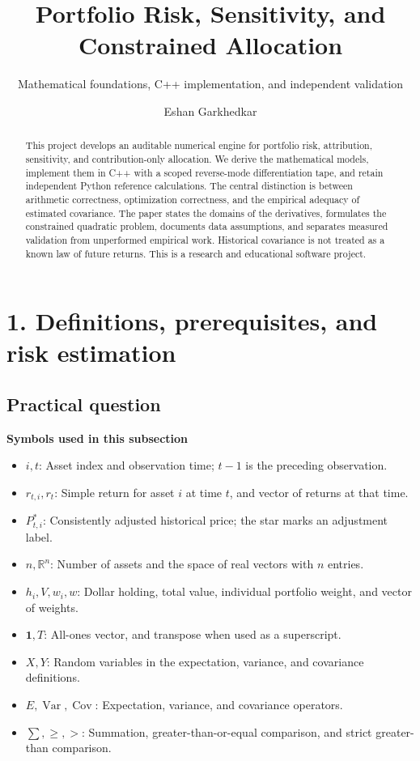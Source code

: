 \documentclass[
  american,
  11pt,
]{article}
\title{Portfolio Risk, Sensitivity, and Constrained Allocation}
\subtitle{Mathematical foundations, C++ implementation, and independent
validation}
\author{Eshan Garkhedkar}
\date{}
\begin{document}
\maketitle
\begin{abstract}
This project develops an auditable numerical engine for portfolio risk,
attribution, sensitivity, and contribution-only allocation. We derive
the mathematical models, implement them in C++ with a scoped
reverse-mode differentiation tape, and retain independent Python
reference calculations. The central distinction is between arithmetic
correctness, optimization correctness, and the empirical adequacy of
estimated covariance. The paper states the domains of the derivatives,
formulates the constrained quadratic problem, documents data
assumptions, and separates measured validation from unperformed
empirical work. Historical covariance is not treated as a known law of
future returns. This is a research and educational software project.
\end{abstract}

{
\setcounter{tocdepth}{2}
\tableofcontents
}
\section{1. Definitions, prerequisites, and risk
estimation}\label{definitions-prerequisites-and-risk-estimation}

\subsection{Practical question}\label{practical-question}

\textbf{Symbols used in this subsection}
\begin{itemize}
\item \(i,t\): Asset index and observation time; $t-1$ is the preceding observation.
\item \(r_{t,i},r_t\): Simple return for asset $i$ at time $t$, and vector of returns at that time.
\item \(P^*_{t,i}\): Consistently adjusted historical price; the star marks an adjustment label.
\item \(n,\mathbb R^n\): Number of assets and the space of real vectors with $n$ entries.
\item \(h_i,V,w_i,w\): Dollar holding, total value, individual portfolio weight, and vector of weights.
\item \(\mathbf1,T\): All-ones vector, and transpose when used as a superscript.
\item \(X,Y\): Random variables in the expectation, variance, and covariance definitions.
\item \(E,\operatorname{Var},\operatorname{Cov}\): Expectation, variance, and covariance operators.
\item \(\sum,\ge,>\): Summation, greater-than-or-equal comparison, and strict greater-than comparison.
\end{itemize}
\end{document}
